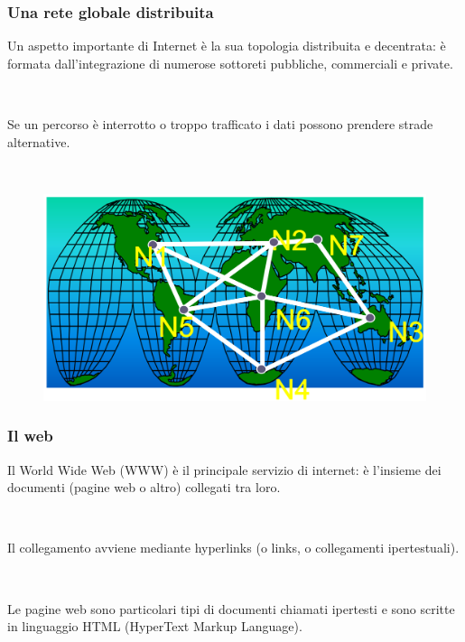 \documentclass[]{beamer}
\begin{document}
\begin{frame}
\frametitle{Una rete globale distribuita}
Un aspetto importante di Internet è la sua \alert<1>{topologia distribuita e decentrata}: è formata dall'integrazione di numerose sottoreti pubbliche, commerciali e private.\pause

~

Se un percorso è interrotto o troppo trafficato i dati possono prendere strade alternative.

~

\begin{figure}
  \includegraphics[width=.5\columnwidth]{img/percorsi.png}
\end{figure}
\end{frame}




\begin{frame}
\frametitle{Il web}
Il \alert<1->{World Wide Web} (WWW) è il principale servizio di internet: è l'insieme dei documenti (pagine web o altro) collegati tra loro.\pause

~

Il collegamento avviene mediante \alert<2>{hyperlinks} (o links, o collegamenti ipertestuali).\pause

~

Le pagine web sono particolari tipi di documenti chiamati \alert<3>{ipertesti} e sono scritte in linguaggio HTML (HyperText Markup Language).
\end{frame}
\end{document}
